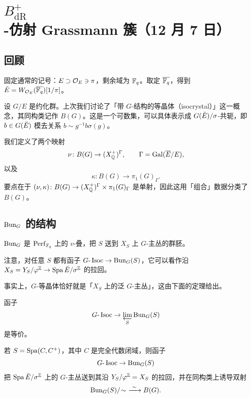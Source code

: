 \section[$B^{+}_{\mathrm{dR}}$-仿射 Grassmann 簇]{$B^{+}_{\mathrm{dR}}$-仿射 Grassmann 簇（12 月 7 日）}


\subsection{回顾}

固定通常的记号：$E\supset\mathcal{O}_E\ni\pi$，剩余域为 $\mathbb{F}_q$。取定 $\overline{\mathbb{F}_q}$，得到 $\breve{E}=W_{\mathcal{O}_E}(\overline{\mathbb{F}_q})[1/\pi]$。

设 $G/E$ 是约化群。上次我们讨论了「带 $G$-结构的等晶体（isocrystal）」这一概念，其同构类记作 $B(G)$。这是一个可数集，可以具体表示成 $G(\breve{E})/\sigma$-共轭，即 $b\in G(\breve{E})$ 模去关系 $b\sim g^{-1}b\sigma(g)$。

我们定义了两个映射
\[
\nu\colon B(G)\to (X^{+}_{\mathbb{Q}})^{\Gamma},\qquad \Gamma=\operatorname{Gal}(\overline{E}/E),
\]
以及
\[
\kappa\colon B(G)\to \pi_1(G)_{\Gamma}.
\]
要点在于 $(\nu,\kappa)\colon B(G)\to (X^{+}_{\mathbb{Q}})^{\Gamma}\times\pi_1(G)_{\Gamma}$ 是单射，因此这用「组合」数据分类了 $B(G)$。

\subsection{$\mathrm{Bun}_G$ 的结构}

\begin{definition}
$\mathrm{Bun}_G$ 是 $\mathrm{Perf}_{\mathbb{F}_q}$ 上的 $v$-叠，把 $S$ 送到 $X_S$ 上 $G$-主丛的群胚。
\end{definition}

注意，对任意 $S$ 都有函子 $G\text{-}\operatorname{Isoc}\to\mathrm{Bun}_G(S)$，它可以看作沿 $X_S=Y_S/\varphi^{\mathbb{Z}}\to\operatorname{Spa}\breve{E}/\sigma^{\mathbb{Z}}$ 的拉回。

\begin{remark}
事实上，$G$-等晶体恰好就是「$X_S$ 上的泛 $G$-主丛」，这由下面的定理给出。
\end{remark}

\begin{theorem}[Anschütz]
函子
\[
G\text{-}\operatorname{Isoc}\to\varprojlim_{S}\mathrm{Bun}_G(S)
\]
是等价。
\end{theorem}

\begin{theorem}
若 $S=\operatorname{Spa}(C,C^+)$，其中 $C$ 是完全代数闭域，则函子
\[
G\text{-}\operatorname{Isoc}\to\mathrm{Bun}_G(S)
\]
把 $\operatorname{Spa}\breve{E}/\sigma^{\mathbb{Z}}$ 上的 $G$-主丛送到其沿 $Y_S/\varphi^{\mathbb{Z}}=X_S$ 的拉回，并在同构类上诱导双射
\[
\mathrm{Bun}_G(S)/\!\sim\ \xrightarrow{\ \sim\ } B(G).
\]
\end{theorem}

